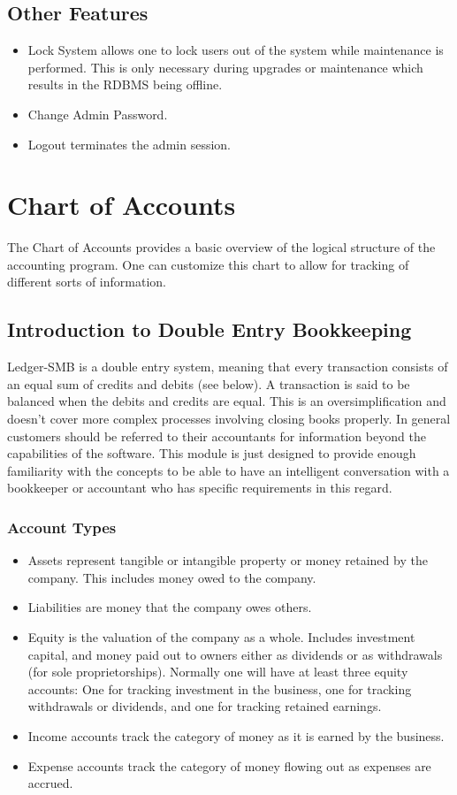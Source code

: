 \documentclass{article}
\begin{document}
\subsection{Other Features}
\begin{itemize}
\item Lock System allows one to lock users out of the system while maintenance
is performed.  This is only necessary during upgrades or maintenance which
results in the RDBMS being offline.
\item Change Admin Password.
\item Logout terminates the admin session.
\end{itemize}

\section{Chart of Accounts}
The Chart of Accounts provides a basic overview of the logical structure of the
accounting program.  One can customize this chart to allow for tracking of
different sorts of information.

\subsection{Introduction to Double Entry Bookkeeping}

Ledger-SMB is a double entry system, meaning that every transaction consists of
an equal sum of credits and debits (see below).  A transaction is said to be 
balanced when the debits and credits are equal.  This is an oversimplification
and doesn't cover more complex processes involving closing books properly.  In
general customers should be referred to their accountants for information beyond
the capabilities of the software.  This module is just designed to provide
enough familiarity with the concepts to be able to have an intelligent
conversation with a bookkeeper or accountant who has specific requirements in 
this regard.

\subsubsection{Account Types}

\begin{itemize}
\item Assets represent tangible or intangible property or money
retained by the company.  This includes money owed to the company.
\item Liabilities are money that the company owes others.
\item Equity is the valuation of the company as a whole.  Includes investment
capital, and money paid out to owners either as dividends or as withdrawals (for
sole proprietorships).  Normally one will have at least three equity accounts:
One for tracking investment in the business, one for tracking withdrawals or
dividends, and one for tracking retained earnings.
\item Income accounts track the category of money as it is earned by the
business.
\item Expense accounts track the category of money flowing out as expenses are
accrued.
\end{itemize}
\end{document}

